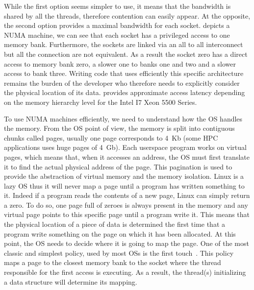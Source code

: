 While the first option seems simpler to use, it means that the bandwidth is shared by all the threads, therefore contention can easily appear.
At the opposite, the second option provides a maximal bandwidth for each socket.
 depicts a \gls{NUMA} machine, we can see that each socket has a privileged access to one memory bank.
Furthermore, the sockets are linked via an all to all interconnect but all the connection are not equivalent.
As a result the socket zero has a direct access to memory bank zero, a slower one to banks one and two and a slower access to bank three.
Writing code that uses efficiently this specific architecture remains the burden of the developer who therefore needs to explicitly consider the physical location of its data.
 provides approximate access latency depending on the memory hierarchy level for  the \gls{Intel} I7 Xeon 5500 Series.

To use \gls{NUMA} machines efficiently, we need to understand how the \gls{OS} handles the memory.
From the \gls{OS} point of view, the memory is split into contiguous chunks called pages, usually one page corresponds to \SI{4}{Kb} (some \gls{HPC} applications uses huge pages of \SI{4}{Gb}).
Each userspace program works on virtual pages, which means that, when it accesses an address, the \gls{OS} must first translate it to find the actual physical address of the page.
This pagination is used to provide the abstraction of virtual memory and the memory isolation.
\gls{Linux} is a lazy \gls{OS} thus it will never map a page until a program has written something to it.
Indeed if a program reads the contents of a new page, \gls{Linux} can simply return a zero.
To do so, one page full of zeroes is always present in the memory and any virtual page points to this specific page until a program write it.
This means that the physical location of a piece of data is determined the first time that a program write something on the page on which it has been allocated.
At this point, the \gls{OS} needs to decide where it is going to map the page.
One of the most classic and simplest policy, used by most \glspl{OS} is the first touch~\cite{Marchetti95Using}.
This policy maps a page to the closest memory bank to the socket where the thread responsible for the first access is executing.
As a result, the thread(s) initializing a data structure will determine its mapping.

